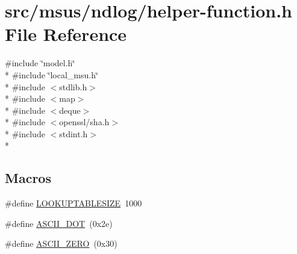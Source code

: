 \hypertarget{helper-function_8h}{\section{src/msus/ndlog/helper-\/function.h File Reference}
\label{helper-function_8h}
}
{\ttfamily \#include \char`\"{}model.\-h\char`\"{}}\\*
{\ttfamily \#include \char`\"{}local\-\_\-msu.\-h\char`\"{}}\\*
{\ttfamily \#include $<$stdlib.\-h$>$}\\*
{\ttfamily \#include $<$map$>$}\\*
{\ttfamily \#include $<$deque$>$}\\*
{\ttfamily \#include $<$openssl/sha.\-h$>$}\\*
{\ttfamily \#include $<$stdint.\-h$>$}\\*
\subsection*{Macros}
\begin{DoxyCompactItemize}
\item 
\#define \hyperlink{helper-function_8h_a4342455851ae586637e6a0abaf3b3f14}{L\-O\-O\-K\-U\-P\-T\-A\-B\-L\-E\-S\-I\-Z\-E}~1000
\item 
\#define \hyperlink{helper-function_8h_a6ec0f0cb1e0c4e317469e4103bec5fd5}{A\-S\-C\-I\-I\-\_\-\-D\-O\-T}~(0x2e)
\item 
\#define \hyperlink{helper-function_8h_abde11a6ee98560227d0d3889da0408e4}{A\-S\-C\-I\-I\-\_\-\-Z\-E\-R\-O}~(0x30)
\end{DoxyCompactItemize}
